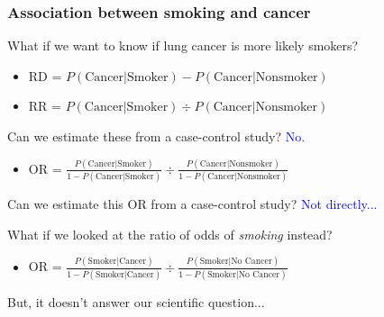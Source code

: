 \documentclass[12pt, 
hyperref={colorlinks=true, linkcolor=blue, urlcolor=cyan}]{beamer}
\begin{document}
\begin{frame}
\frametitle{Association between smoking and cancer}

What if we want to know if lung cancer is more likely smokers?

\begin{itemize}
\item RD = $P(\text{Cancer}|\text{Smoker}) - P(\text{Cancer}|\text{Nonsmoker})$
\item RR = $P(\text{Cancer}|\text{Smoker}) \div P(\text{Cancer}|\text{Nonsmoker})$
\end{itemize}

Can we estimate these from a case-control study? \pause \textcolor{blue}{No.} \pause

\begin{itemize}
\item OR = $\frac{P(\text{Cancer}|\text{Smoker})}{1-P(\text{Cancer}|\text{Smoker})} \div \frac{P(\text{Cancer}|\text{Nonsmoker})}{1-P(\text{Cancer}|\text{Nonsmoker})}$
\end{itemize}

Can we estimate this OR from a case-control study? \pause \textcolor{blue}{Not directly...} \pause

What if we looked at the ratio of odds of \textit{smoking} instead?
\begin{itemize}
\item OR = $\frac{P(\text{Smoker}|\text{Cancer})}{1-P(\text{Smoker}|\text{Cancer})} \div \frac{P(\text{Smoker}|\text{No Cancer})}{1-P(\text{Smoker}|\text{No Cancer})}$
\end{itemize}

But, it doesn't answer our scientific question...
\end{frame}
\end{document}

